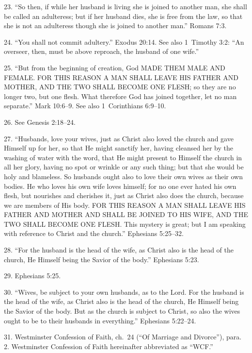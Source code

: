 \documentclass[
]{book}
\begin{document}
23. ``So then, if while her husband is living she is joined to another man, she shall be called an adulteress; but if her husband dies, she is free from the law, so that she is not an adulteress though she is joined to another man.'' Romans 7:3.

24. ``You shall not commit adultery.'' Exodus 20:14. See also 1~Timothy 3:2: ``An overseer, then, must be above reproach, the husband of one wife.''

25. ``But from the beginning of creation, God MADE THEM MALE AND FEMALE. FOR THIS REASON A MAN SHALL LEAVE HIS FATHER AND MOTHER, AND THE TWO SHALL BECOME ONE FLESH; so they are no longer two, but one flesh. What therefore God has joined together, let no man separate.'' Mark 10:6--9. See also 1~Corinthians 6:9--10.

26. See Genesis 2:18--24.

27. ``Husbands, love your wives, just as Christ also loved the church and gave Himself up for her, so that He might sanctify her, having cleansed her by the washing of water with the word, that He might present to Himself the church in all her glory, having no spot or wrinkle or any such thing; but that she would be holy and blameless. So husbands ought also to love their own wives as their own bodies. He who loves his own wife loves himself; for no one ever hated his own flesh, but nourishes and cherishes it, just as Christ also does the church, because we are members of His body. FOR THIS REASON A MAN SHALL LEAVE HIS FATHER AND MOTHER AND SHALL BE JOINED TO HIS WIFE, AND THE TWO SHALL BECOME ONE FLESH. This mystery is great; but I am speaking with reference to Christ and the church.'' Ephesians 5:25--32.

28. ``For the husband is the head of the wife, as Christ also is the head of the church, He Himself being the Savior of the body.'' Ephesians 5:23.

29. Ephesians 5:25.

30. ``Wives, be subject to your own husbands, as to the Lord. For the husband is the head of the wife, as Christ also is the head of the church, He Himself being the Savior of the body. But as the church is subject to Christ, so also the wives ought to be to their husbands in everything.'' Ephesians 5:22--24.

31. Westminster Confession of Faith, ch.~24 (``Of Marriage and Divorce''), para. 2. Westminster Confession of Faith hereinafter abbreviated as ``WCF.''
\end{document}
